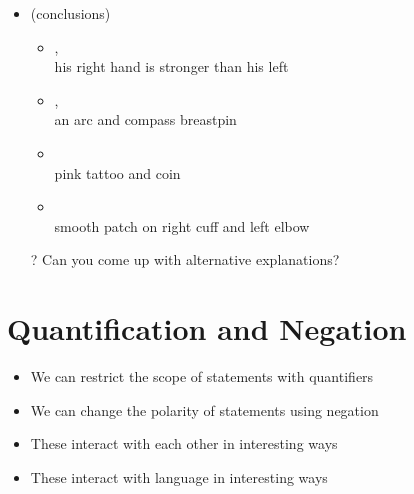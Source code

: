 \documentclass[a4paper,landscape,headrule,footrule,xetex]{foils}
\begin{document}

\begin{itemize}
\item {} \hfill (conclusions)
  \begin{itemize}
  \item  {}, 
    \\ his right hand is stronger than his left

  \item  {}, 
    \\ an arc and compass breastpin
  \item  {}
    \\ pink tattoo and coin
  \item  {}
    \\ smooth patch on right cuff and left elbow
  \end{itemize}
  \item[?] Can you come up with alternative explanations?\task
\end{itemize}







\section{Quantification and Negation}

\begin{itemize}
\item We can restrict the scope of statements with quantifiers
\item We can change the polarity of statements using negation
\item These interact with each other in interesting ways
\item These interact with language in interesting ways
\end{itemize}

\end{document}
